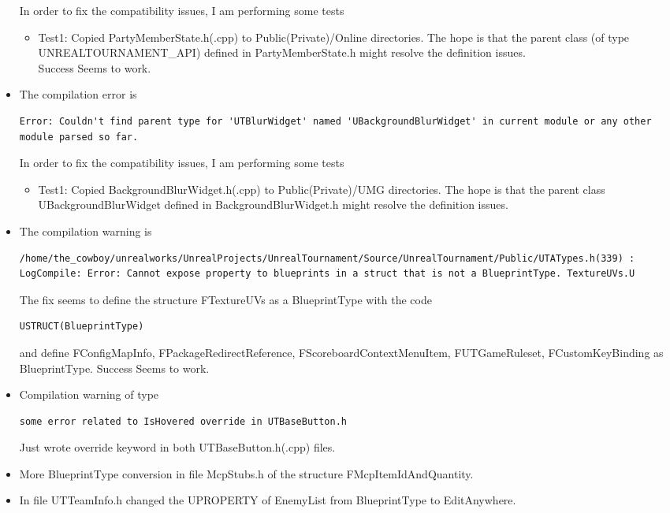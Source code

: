 \documentclass{article}
\begin{document}
\begin{itemize}
\begin{lstlisting}[frame=single]
\end{lstlisting}
In order to fix the compatibility issues, I am performing some tests
\begin{itemize}
\item Test1: Copied {\color{filecolor}PartyMemberState.h(.cpp)} to {\ttfamily Public(Private)/Online } directories.  The hope is that the parent class {\color{classcolor}} (of type UNREALTOURNAMENT\_API) defined in {\color{filecolor}PartyMemberState.h} might resolve the definition issues.\\
   {\color{Green} Success} Seems to work.
 \end{itemize}
\item The compilation error is
\lstset{language=bash} 
\begin{lstlisting}[frame=single]
Error: Couldn't find parent type for 'UTBlurWidget' named 'UBackgroundBlurWidget' in current module or any other module parsed so far.
\end{lstlisting}
In order to fix the compatibility issues, I am performing some tests
\begin{itemize}
\item Test1: Copied {\color{filecolor}BackgroundBlurWidget.h(.cpp)} to {\ttfamily Public(Private)/UMG} directories.  The hope is that the parent class {\color{classcolor}UBackgroundBlurWidget} defined in {\color{filecolor}BackgroundBlurWidget.h} might resolve the definition issues.\\
\end{itemize}
\item The compilation warning is
  \lstset{language=bash} 
\begin{lstlisting}[frame=single]
/home/the_cowboy/unrealworks/UnrealProjects/UnrealTournament/Source/UnrealTournament/Public/UTATypes.h(339) : LogCompile: Error: Cannot expose property to blueprints in a struct that is not a BlueprintType. TextureUVs.U
\end{lstlisting}
The fix seems to define the structure FTextureUVs as a BlueprintType with the code
 \lstset{language=c++} 
\begin{lstlisting}[frame=single]
USTRUCT(BlueprintType)
\end{lstlisting}
and define FConfigMapInfo, FPackageRedirectReference, FScoreboardContextMenuItem, FUTGameRuleset, FCustomKeyBinding as BlueprintType.  {\color{green}Success} Seems to work.
\item Compilation warning of type
  \lstset{language=bash} 
\begin{lstlisting}[frame=single]
some error related to IsHovered override in UTBaseButton.h 
\end{lstlisting}
Just wrote override keyword in both {\color{filecolor}UTBaseButton.h(.cpp)} files.
\item More BlueprintType conversion in file {\color{filecolor}McpStubs.h} of the structure FMcpItemIdAndQuantity.
\item In file {\color{filecolor}UTTeamInfo.h} changed the UPROPERTY of EnemyList from BlueprintType to EditAnywhere.
\end{itemize}
\end{document}
